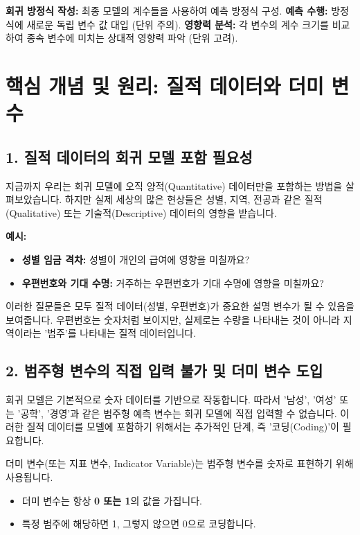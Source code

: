 \documentclass[11pt,a4paper]{article}
\theoremstyle{definition}
\begin{document}
\begin{tcolorbox}[title=\textbf{모델 활용}]
\textbf{회귀 방정식 작성:} 최종 모델의 계수들을 사용하여 예측 방정식 구성.
\textbf{예측 수행:} 방정식에 새로운 독립 변수 값 대입 (단위 주의).
\textbf{영향력 분석:} 각 변수의 계수 크기를 비교하여 종속 변수에 미치는 상대적 영향력 파악 (단위 고려).
\end{tcolorbox}

\newpage

\section{핵심 개념 및 원리: 질적 데이터와 더미 변수}

\subsection{1. 질적 데이터의 회귀 모델 포함 필요성}
지금까지 우리는 회귀 모델에 오직 양적(Quantitative) 데이터만을 포함하는 방법을 살펴보았습니다. 하지만 실제 세상의 많은 현상들은 성별, 지역, 전공과 같은 질적(Qualitative) 또는 기술적(Descriptive) 데이터의 영향을 받습니다.

\begin{examplebox}
\textbf{예시:}
\begin{itemize}
    \item \textbf{성별 임금 격차:} 성별이 개인의 급여에 영향을 미칠까요?
    \item \textbf{우편번호와 기대 수명:} 거주하는 우편번호가 기대 수명에 영향을 미칠까요?
\end{itemize}
이러한 질문들은 모두 질적 데이터(성별, 우편번호)가 중요한 설명 변수가 될 수 있음을 보여줍니다. 우편번호는 숫자처럼 보이지만, 실제로는 수량을 나타내는 것이 아니라 지역이라는 '범주'를 나타내는 질적 데이터입니다.
\end{examplebox}

\subsection{2. 범주형 변수의 직접 입력 불가 및 더미 변수 도입}
회귀 모델은 기본적으로 숫자 데이터를 기반으로 작동합니다. 따라서 '남성', '여성' 또는 '공학', '경영'과 같은 범주형 예측 변수는 회귀 모델에 직접 입력할 수 없습니다. 이러한 질적 데이터를 모델에 포함하기 위해서는 추가적인 단계, 즉 '코딩(Coding)'이 필요합니다.

\begin{tcolorbox}[title=더미 변수(Dummy Variable)의 정의]
더미 변수(또는 지표 변수, Indicator Variable)는 범주형 변수를 숫자로 표현하기 위해 사용됩니다.
\begin{itemize}
    \item 더미 변수는 항상 \textbf{0 또는 1}의 값을 가집니다.
    \item 특정 범주에 해당하면 1, 그렇지 않으면 0으로 코딩합니다.
\end{itemize}
\end{tcolorbox}
\end{document}
